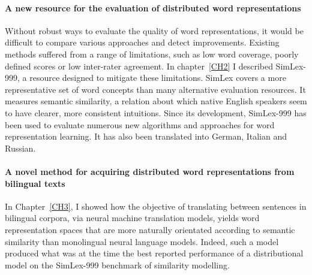 \paragraph{A new resource for the evaluation of distributed word representations} Without robust ways to evaluate the quality of word representations, it would be difficult to compare various approaches and detect improvements. Existing methods suffered from a range of limitations, such as low word coverage, poorly defined scores or low inter-rater agreement. In chapter~\ref{CH2} I described SimLex-999, a resource designed to mitigate these limitations. SimLex covers a more representative set of word concepts than many alternative evaluation resources. It measures semantic similarity, a relation about which native English speakers seem to have clearer, more consistent intuitions. Since its development, SimLex-999 has been used to evaluate numerous new algorithms and approaches for word representation learning. It has also been translated into German, Italian and Russian. 

\paragraph{A novel method for acquiring distributed word representations from bilingual texts} In Chapter~\ref{CH3}, I showed how the objective of translating between sentences in bilingual corpora, via neural machine translation models, yields word representation spaces that are more naturally orientated according to semantic similarity than monolingual neural language models. Indeed, such a model produced what was at the time the best reported performance of a distributional model on the SimLex-999 benchmark of similarity modelling.  

